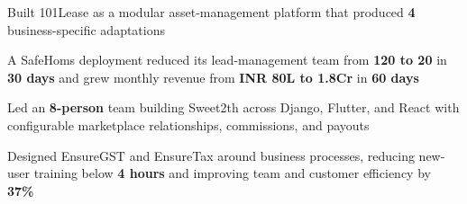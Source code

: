 \vspace*{0.28em}
\begin{cvitems}
  \item Built 101Lease as a modular asset-management platform that produced \textbf{4} business-specific adaptations
  \item A SafeHoms deployment reduced its lead-management team from \textbf{120 to 20} in \textbf{30 days} and grew monthly revenue from \textbf{INR 80L to 1.8Cr} in \textbf{60 days}
  \item Led an \textbf{8-person} team building Sweet2th across Django, Flutter, and React with configurable marketplace relationships, commissions, and payouts
  \item Designed EnsureGST and EnsureTax around business processes, reducing new-user training below \textbf{4 hours} and improving team and customer efficiency by \textbf{37\%}
\end{cvitems}
